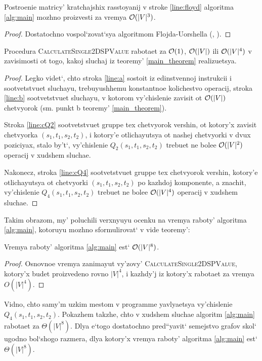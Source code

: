 \begin{proposition}
Postroenie matricy' kratchajshix rasstoyanij v stroke \ref{line:floyd} algoritma \ref{alg:main} mozhno proizvesti za vremya $\mathcal{O}(|V|^3)$.
\end{proposition}
\begin{proof}
Dostatochno vospol`zovat`sya algoritmom Flojda-Uorshella (\cite{Floyd}, \cite{CLRS}).
\end{proof}

\begin{proposition}
Procedura \textsc{CalculateSingle2DSPValue} rabotaet za $\mathcal{O}(1)$, $\mathcal{O}(|V|)$ ili $\mathcal{O}(|V|^4)$ v zavisimosti ot togo, kakoj sluchaj iz teoremy' \ref{main_theorem} realizuetsya.
\end{proposition}
\begin{proof}
Legko videt`, chto stroka \ref{line:a} sostoit iz edinstvennoj instrukcii i sootvetstvuet sluchayu, trebuyushhemu konstantnoe kolichestvo operacij, stroka \ref{line:b} sootvetstvuet sluchayu, v kotorom vy'chislenie zavisit ot $\mathcal{O}(|V|)$ chetvyorok (sm. punkt b teoremy' \ref{main_theorem}). 

Stroka \ref{line:cQ2} sootvetstvuet gruppe tex chetvyorok vershin, ot kotory'x zavisit chetvyorka $(s_1, t_1, s_2, t_2)$, i kotory'e otlichayutsya ot nashej chetvyorki v dvux poziciyax, stalo by't`, vy'chislenie $Q_2(s_1, t_1, s_2, t_2)$ trebuet ne bolee $\mathcal{O}(|V|^2)$ operacij v xudshem sluchae.

Nakonecz, stroka \ref{line:cQ4} sootvetstvuet gruppe tex chetvyorok vershin, kotory'e otlichayutsya ot chetvyorki $(s_1, t_1, s_2, t_2)$ po kazhdoj komponente, a znachit, vy'chislenie $Q_4(s_1, t_1, s_2, t_2)$ trebuet ne bolee $\mathcal{O}(|V|^4)$ operacij v xudshem sluchae.
\end{proof}

Takim obrazom, my' poluchili verxnyuyu ocenku na vremya raboty' algoritma \ref{alg:main}, kotoruyu mozhno sformulirovat` v vide teoremy':

\begin{theorem}
Vremya raboty' algoritma \ref{alg:main} est` $\mathcal{O}(|V|^8)$.
\end{theorem}
\begin{proof}
Osnovnoe vremya zanimayut vy'zovy' \textsc{CalculateSingle2DSPValue}, kotory'x budet proizvedeno rovno $|V|^4$, i kazhdy'j iz kotory'x rabotaet za vremya $O(|V|^4)$.
\end{proof}

Vidno, chto samy'm uzkim mestom v programme yavlyaetsya vy'chislenie $Q_4(s_1, t_1, s_2, t_2)$. Pokazhem takzhe, chto v xudshem sluchae algoritm \ref{alg:main} rabotaet za $\Theta(|V|^8)$. Dlya e`togo dostatochno pred``yavit` semejstvo grafov skol` ugodno bol`shogo razmera, dlya kotory'x vremya raboty' algoritma \ref{alg:main} est` $\Theta(|V|^8)$.

